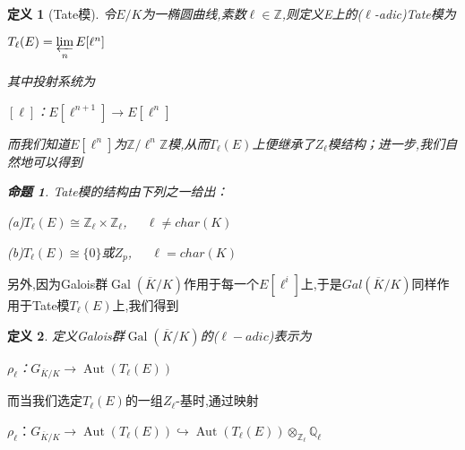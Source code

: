 \documentclass[11pt]{ctexart}
\DeclareMathOperator{\Aut}{Aut}
\DeclareMathOperator{\Gal}{Gal}
\newtheorem{defi}{定义}[section]
\newtheorem{pro}{命题}[section]
\begin{document}
\begin{defi}[Tate模]令$E/K$为一椭圆曲线,素数$\ell \in \mathbb{Z}$,则定义E上的($\ell$-adic)Tate模为
\begin{center}
    $T_{\ell}(E)=\varprojlim\limits_{n}E[\ell^n]$
\end{center}
\noindent 其中投射系统为
\begin{center}
    $[\ell]$：$E[\ell^{n+1}]\longrightarrow E[\ell^n]$
\end{center}
而我们知道$E[\ell^n]$为$\mathbb{Z}/\ell^n\mathbb{Z}$模,从而$T_{\ell}(E)$上便继承了$Z_{\ell}$模结构；进一步,我们自然地可以得到

\begin{pro}Tate模的结构由下列之一给出：

    (a)$T_{\ell}(E) \cong \mathbb{Z}_{\ell} \times \mathbb{Z}_{\ell}$,~~~$\ell \neq char(K)$

    (b)$T_{\ell}(E) \cong \{0\}$或$Z_p$,~~~$\ell = char(K)$


\end{pro}


\end{defi}
 另外,因为Galois群$\Gal(\overline{K}/K)$作用于每一个$E[\ell^i]$上,于是$Gal(\overline{K}/K)$同样作用于Tate模$T_{\ell}(E)$上,我们得到

 \begin{defi}定义Galois群$\Gal(\overline{K}/K)$的($\ell-adic$)表示为
    \begin{center}

    $\rho_{\ell}$：$G_{\overline{K}/K}\longrightarrow \Aut(T_{\ell}(E))$
    \end{center}


 \end{defi}

 \noindent 而当我们选定$T_{\ell}(E)$的一组$Z_{\ell}$-基时,通过映射
 \begin{center}
    $\rho_{\ell}$：$G_{\overline{K}/K}\longrightarrow \Aut(T_{\ell}(E)) \hookrightarrow \Aut(T_{\ell}(E))\otimes_{\mathbb{Z}_{\ell}} \mathbb{Q}_{\ell}$
 \end{center}
\end{document}
